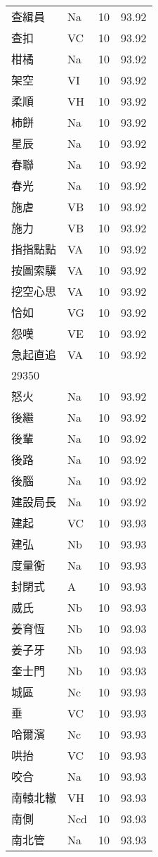 \documentclass[twocolumn]{book}
\begin{document}
\begin{supertabular}{llrr}
查緝員 & Na & 10 &  93.92\\
查扣 & VC & 10 &  93.92\\
柑橘 & Na & 10 &  93.92\\
架空 & VI & 10 &  93.92\\
柔順 & VH & 10 &  93.92\\
柿餅 & Na & 10 &  93.92\\
星辰 & Na & 10 &  93.92\\
春聯 & Na & 10 &  93.92\\
春光 & Na & 10 &  93.92\\
施虐 & VB & 10 &  93.92\\
施力 & VB & 10 &  93.92\\
指指點點 & VA & 10 &  93.92\\
按圖索驥 & VA & 10 &  93.92\\
挖空心思 & VA & 10 &  93.92\\
恰如 & VG & 10 &  93.92\\
怨嘆 & VE & 10 &  93.92\\
急起直追 & VA & 10 &  93.92\\
29350\\
怒火 & Na & 10 &  93.92\\
後繼 & Na & 10 &  93.92\\
後輩 & Na & 10 &  93.92\\
後路 & Na & 10 &  93.92\\
後腦 & Na & 10 &  93.92\\
建設局長 & Na & 10 &  93.92\\
建起 & VC & 10 &  93.93\\
建弘 & Nb & 10 &  93.93\\
度量衡 & Na & 10 &  93.93\\
封閉式 & A & 10 &  93.93\\
威氏 & Nb & 10 &  93.93\\
姜育恆 & Nb & 10 &  93.93\\
姜子牙 & Nb & 10 &  93.93\\
奎士門 & Nb & 10 &  93.93\\
城區 & Nc & 10 &  93.93\\
垂 & VC & 10 &  93.93\\
哈爾濱 & Nc & 10 &  93.93\\
哄抬 & VC & 10 &  93.93\\
咬合 & Na & 10 &  93.93\\
南轅北轍 & VH & 10 &  93.93\\
南側 & Ncd & 10 &  93.93\\
南北管 & Na & 10 &  93.93\\

\end{supertabular}
\end{document}
